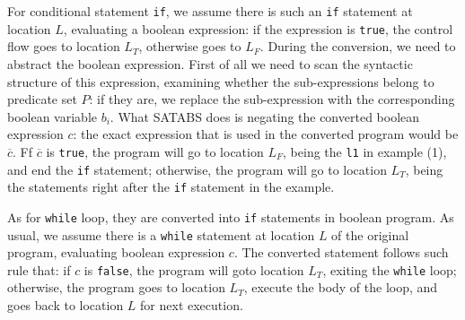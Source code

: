 \documentclass[10pt,journal,final,]{article}
\theoremstyle{definition}
\begin{document}
For conditional statement \lstinline|if|, we assume there is such an \lstinline|if| statement at location $L$, evaluating a boolean expression: if the expression is \lstinline|true|, the control flow goes to location $L_{T}$,
otherwise goes to $L_{F}$.
During the conversion, we need to abstract the boolean expression. First of all we need to scan the syntactic structure of this expression, examining whether the sub-expressions belong to predicate set $P$:
if they are, we replace the sub-expression with the corresponding boolean variable $b_{i}$.
What SATABS does is negating the converted boolean expression $c$: the exact expression that is used in the converted program would be $\overline{c}$. Ff $\overline{c}$ is \lstinline|true|, the program will go to location $L_{F}$,
being the \lstinline|l1| in example (1), and end the \lstinline|if| statement; otherwise, the program will go to location $L_{T}$, being the statements right after the \lstinline|if| statement in the example.

As for \lstinline|while| loop, they are converted into \lstinline|if| statements in boolean program.
As usual, we assume there is a \lstinline|while| statement at location $L$ of the original program, evaluating boolean expression $c$. The converted statement follows such rule that: if $c$ is \lstinline|false|,
the program will goto location $L_{T}$, exiting the \lstinline|while| loop; otherwise, the program goes to location $L_{T}$, execute the body of the loop, and goes back to location $L$ for next execution.
\end{document}
